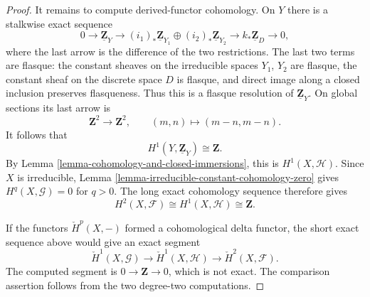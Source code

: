 \begin{proof}
It remains to compute derived-functor cohomology. On $Y$ there is a
stalkwise exact sequence
$$
0 \to \underline{\mathbf{Z}}_Y \to
(i_1)_*\underline{\mathbf{Z}}_{Y_1} \oplus
(i_2)_*\underline{\mathbf{Z}}_{Y_2} \to
k_*\underline{\mathbf{Z}}_D \to 0,
$$
where the last arrow is the difference of the two restrictions. The last
two terms are flasque: the constant sheaves on the irreducible spaces
$Y_1$, $Y_2$ are flasque, the constant sheaf on the discrete space $D$ is
flasque, and direct image along a closed inclusion preserves flasqueness.
Thus this is a flasque resolution of $\underline{\mathbf{Z}}_Y$. On global
sections its last arrow is
$$
\mathbf{Z}^2 \longrightarrow \mathbf{Z}^2, \qquad
(m, n) \longmapsto (m - n, m - n).
$$
It follows that
$$
H^1(Y, \underline{\mathbf{Z}}_Y) \cong \mathbf{Z}.
$$
By Lemma \ref{lemma-cohomology-and-closed-immersions}, this is
$H^1(X, \mathcal{H})$. Since $X$ is irreducible,
Lemma \ref{lemma-irreducible-constant-cohomology-zero} gives
$H^q(X, \mathcal{G}) = 0$ for $q > 0$. The long exact cohomology sequence
therefore gives
$$
H^2(X, \mathcal{F}) \cong H^1(X, \mathcal{H}) \cong \mathbf{Z}.
$$

If the functors $\check{H}^p(X, -)$ formed a cohomological delta functor,
the short exact sequence above would give an exact segment
$$
\check{H}^1(X, \mathcal{G}) \longrightarrow
\check{H}^1(X, \mathcal{H}) \longrightarrow
\check{H}^2(X, \mathcal{F}).
$$
The computed segment is $0 \to \mathbf{Z} \to 0$, which is not exact.
The comparison assertion follows from the two degree-two computations.
\end{proof}

